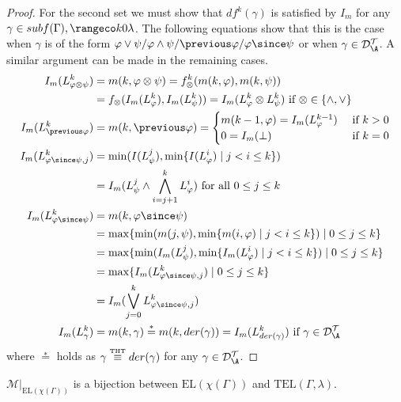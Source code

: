 \begin{proof}
  For the second set we must show that $df^k(\gamma)$ is satisfied by
  $I_m$ for any $\gamma \in subf(\Gamma), \kinlambda$. The following
  equations show that this is the case when $\gamma$ is of the form
  $\varphi \lor \psi/\varphi \land \psi/\previous \varphi/\varphi
  \since \psi$ or when $\gamma \in \langdat$. A similar argument can
  be made in the remaining cases.
  \begin{align*}
  I_m(L^k_{\varphi \otimes \psi}) &= m(k,\varphi \otimes \psi) = f_{\otimes}^k(m(k,\varphi),m(k,\psi))\\
  &= f_{\otimes}(I_m(L^k_\varphi),I_m(L^k_\psi)) = I_m(L^k_{\varphi} \otimes L^k_{\psi}) \text{ if } \otimes \in \{ \land, \lor \}\\
  I_m(L^k_{\previous \varphi}) &= m(k,\previous \varphi) = \begin{cases}
    m(k-1,\varphi)=I_m(L^{k-1}_\varphi) &\text{ if } k > 0\\
    0=I_m(\bot) &\text{ if } k = 0
  \end{cases}\\
    I_m(L_{\varphi \since \psi,j}^k) &= \min (I(L^j_{\psi}), \min \{I(L^i_{\varphi}) \mid j<i \leq k\})\\
                                  &= I_m(L_\psi^j \wedge \bigwedge_{i=j+1}^{k}L_{\varphi}^i) \text{ for all } 0 \leq j \leq k\\
    I_m(L^k_{\varphi \since \psi}) 
                                  &= m(k,\varphi \since \psi)\\ 
                                  &= \max \{\min (m(j, \psi), \min \{m(i, \varphi) \mid j<i \leq k\}) \mid 0 \leq j \leq k\}\\
                                  &= \max \{\min (I_m(L^j_{\psi}), \min \{I_m(L^i_{\varphi}) \mid j<i \leq k\}) \mid 0 \leq j \leq k\} \\
                                  &= \max \{ I_m(L_{\varphi \since \psi,j}^k) \mid 0 \leq j \leq k \} \\
                                  &= I_m(\bigvee_{j=0}^{k} L_{\varphi \since \psi,j}^k )\\
    I_m(L^k_{\gamma}) &= m(k,\gamma) \stackrel{*}{=} m(k,der(\gamma)) = I_m(L^k_{der(\gamma)}) \text{ if } \gamma \in \langdat
  \end{align*}
  where $\stackrel{*}{=}$ holds as $\gamma \stackrel{\normalfont\mbox{\tiny THT}}{\equiv} der(\gamma)$ for
  any $\gamma \in \langdat$.
\end{proof}

\begin{corollary}\label{cor:bijection-of-sm}
  $\mathcal{M}\vert_{\text{EL}(\chi(\Gamma))}$ is a bijection
  between $\text{EL}(\chi(\Gamma))$ and $\text{TEL}(\Gamma,\lambda)$.
\end{corollary}

